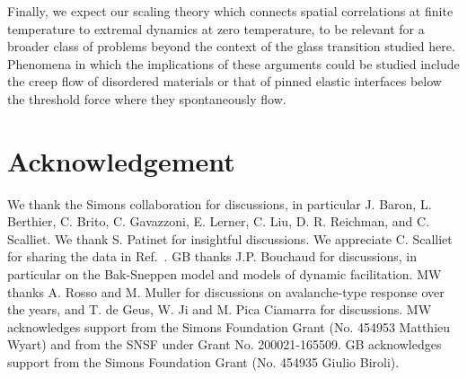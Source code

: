 \documentclass[pre,twocolumn,superscriptaddress,tightenlines,showpacs,longbibliography,floatfix,footinbib]{revtex4-1}
\begin{document}
Finally, we expect our scaling theory which connects spatial correlations at finite temperature to extremal dynamics at zero temperature, to be relevant for a broader class of problems beyond the context of the glass transition studied here. Phenomena in which the implications of these arguments could be studied include the creep flow of disordered materials  \cite{castellanos2018avalanche,Bauer2006, Caton2008, Divoux2011, Siebenbuerger2012, Grenard2014, Leocmach2014} or that of pinned elastic interfaces  \cite{bustingorry2007thermal, purrello2017creep,kolton2005creep} below the threshold force where they spontaneously flow. 



\section*{Acknowledgement}

We thank the Simons collaboration for discussions, in particular J. Baron, L. Berthier, C. Brito, C. Gavazzoni, E. Lerner, C. Liu, D. R. Reichman, and C. Scalliet. We thank S. Patinet for insightful discussions. 
We appreciate C. Scalliet for sharing the data in Ref.~\cite{scalliet2022thirty}.
GB thanks J.P. Bouchaud for discussions, in particular on the Bak-Sneppen model and models of dynamic facilitation.  MW thanks A. Rosso and M. Muller for discussions on avalanche-type response over the years, and T. de Geus, W. Ji and M. Pica Ciamarra for discussions. MW acknowledges
support from the Simons Foundation Grant (No. 454953 Matthieu Wyart) and from the SNSF under Grant No. 200021-165509. GB 
acknowledges
support from the Simons Foundation Grant (No. 454935 Giulio Biroli).
\appendix

\end{document}
